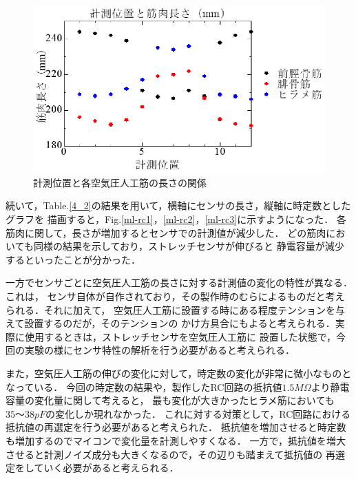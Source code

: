 \begin{figure}[h]
    \begin{center}
        \includegraphics[width=0.78\columnwidth,clip]{4_consideration/ml.eps}
    \end{center}
    \caption{計測位置と各空気圧人工筋の長さの関係}
    \label{4-ml}
\end{figure}

\newpage

続いて，Table.\ref{4_2}の結果を用いて，横軸にセンサの長さ，縦軸に時定数としたグラフを
描画すると，Fig.\ref{ml-rc1}，\ref{ml-rc2}，\ref{ml-rc3}に示すようになった．
各筋肉に関して，長さが増加するとセンサでの計測値が減少した．
どの筋肉においても同様の結果を示しており，ストレッチセンサが伸びると
静電容量が減少するといったことが分かった．

一方でセンサごとに空気圧人工筋の長さに対する計測値の変化の特性が異なる．これは，
センサ自体が自作されており，その製作時のむらによるものだと考えられる．それに加えて，
空気圧人工筋に設置する時にある程度テンションを与えて設置するのだが，そのテンションの
かけ方具合にもよると考えられる．実際に使用するときは，ストレッチセンサを空気圧人工筋に
設置した状態で，今回の実験の様にセンサ特性の解析を行う必要があると考えられる．

また，空気圧人工筋の伸びの変化に対して，時定数の変化が非常に微小なものとなっている．
今回の時定数の結果や，製作したRC回路の抵抗値$1.5M\Omega$より静電容量の変化量に関して考えると，
最も変化が大きかったヒラメ筋においても$35～38pF$の変化しか現れなかった．
これに対する対策として，RC回路における抵抗値の再選定を行う必要があると考えられた．
抵抗値を増加させると時定数も増加するのでマイコンで変化量を計測しやすくなる．
一方で，抵抗値を増大させると計測ノイズ成分も大きくなるので，その辺りも踏まえて抵抗値の
再選定をしていく必要があると考えられる．

